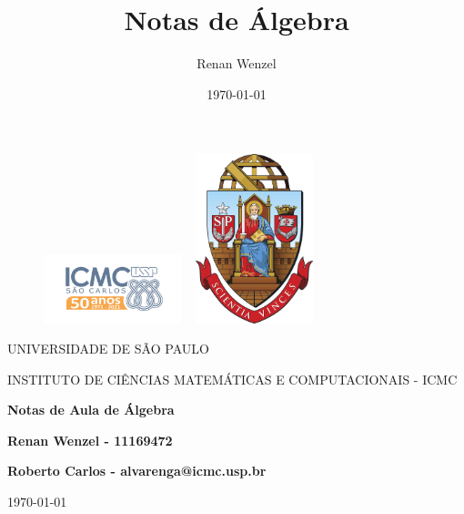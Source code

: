 \documentclass{article}
\title{Notas de Álgebra}
\author{Renan Wenzel}
\date{\today}
\begin{document}
\begin{figure}[ht]
	\includegraphics[width=4cm]{icmc.png}
	\hspace{7cm}
	\includegraphics[height=4.9cm,width=4cm]{brasao_usp_cor.jpg}
	\endminipage
\end{figure}

\begin{center}
	\vspace{1cm}
	\LARGE
	UNIVERSIDADE DE SÃO PAULO

	\vspace{1.3cm}
	\LARGE
	INSTITUTO DE CIÊNCIAS MATEMÁTICAS E COMPUTACIONAIS - ICMC

	\vspace{1.7cm}
	\Large
	\textbf{Notas de Aula de Álgebra}

	\vspace{1.3cm}
	\large
	\textbf{Renan Wenzel - 11169472}

	\vspace{1.3cm}
	\large
	\textbf{Roberto Carlos - alvarenga@icmc.usp.br}

	\vspace{1.3cm}
	\today
\end{center}

\newpage

\tableofcontents

\newpage

\newpage

\newpage

\newpage

\newpage

\newpage

\newpage

\newpage

\newpage

\newpage

\newpage

\newpage

\newpage

\newpage

\newpage

\newpage
\end{document}
